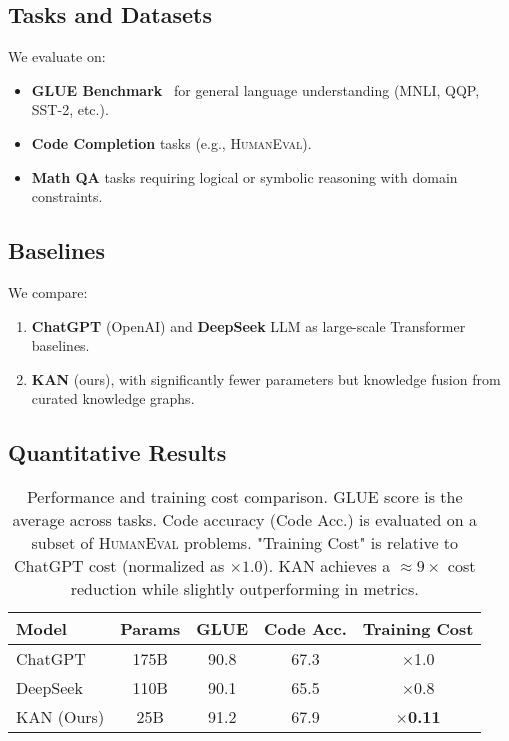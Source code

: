 \documentclass[11pt]{article}
\begin{document}
\subsection{Tasks and Datasets}
We evaluate on:
\begin{itemize}
    \item \textbf{GLUE Benchmark}~\cite{wang2018glue} for general language understanding (MNLI, QQP, SST-2, etc.).
    \item \textbf{Code Completion} tasks (e.g., \textsc{HumanEval}).
    \item \textbf{Math QA} tasks requiring logical or symbolic reasoning with domain constraints.
\end{itemize}

\subsection{Baselines}
We compare:
\begin{enumerate}
    \item \textbf{ChatGPT} (OpenAI) and \textbf{DeepSeek} LLM as large-scale Transformer baselines.
    \item \textbf{KAN} (ours), with significantly fewer parameters but knowledge fusion from curated knowledge graphs.
\end{enumerate}

\subsection{Quantitative Results}
\begin{table}[h]
\centering
\caption{Performance and training cost comparison. GLUE score is the average across tasks. 
Code accuracy (Code Acc.) is evaluated on a subset of \textsc{HumanEval} problems. 
"Training Cost" is relative to ChatGPT cost (normalized as $\times 1.0$). 
KAN achieves a $\approx 9\times$ cost reduction while slightly outperforming in metrics.}
\label{tab:main_results}  %
\begin{tabular}{l|ccc|c}
\hline
\textbf{Model} & \textbf{Params} & \textbf{GLUE} & \textbf{Code Acc.} & \textbf{Training Cost} \\
\hline
ChatGPT        & 175B  & 90.8 & 67.3 & $\times$1.0 \\
DeepSeek       & 110B  & 90.1 & 65.5 & $\times$0.8 \\
KAN (Ours)     & 25B   & 91.2 & 67.9 & $\times$\textbf{0.11} \\
\hline
\end{tabular}
\end{table}
\end{document}
